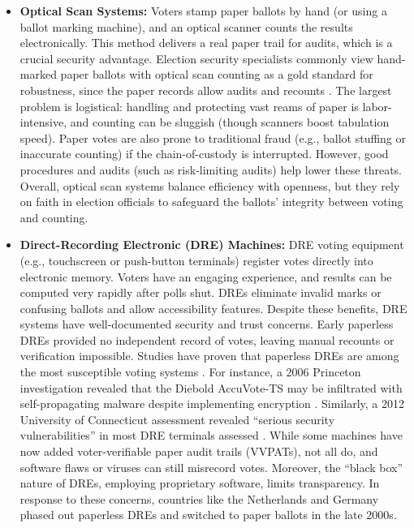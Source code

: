 \documentclass[a4paper,10pt]{report}
\begin{document}
  \begin{itemize} \item \textbf  {Optical Scan Systems:}   Voters stamp paper ballots by hand (or using a ballot marking machine), and an optical scanner counts the results electronically.   This method delivers a real paper trail for audits, which is a crucial security advantage.   Election security specialists commonly view hand-marked paper ballots with optical scan counting as a gold standard for robustness, since the paper records allow audits and recounts \cite{brookings}.   The largest problem is logistical: handling and protecting vast reams of paper is labor-intensive, and counting can be sluggish (though scanners boost tabulation speed).   Paper votes are also prone to traditional fraud (e.g., ballot stuffing or inaccurate counting) if the chain-of-custody is interrupted.   However, good procedures and audits (such as risk-limiting audits) help lower these threats.   Overall, optical scan systems balance efficiency with openness, but they rely on faith in election officials to safeguard the ballots’ integrity between voting and counting.

      \item \textbf  {Direct-Recording Electronic (DRE) Machines:}   DRE voting equipment (e.g., touchscreen or push-button terminals) register votes directly into electronic memory.   Voters have an engaging experience, and results can be computed very rapidly after polls shut.   DREs eliminate invalid marks or confusing ballots and allow accessibility features.   Despite these benefits, DRE systems have well-documented security and trust concerns.   Early paperless DREs provided no independent record of votes, leaving manual recounts or verification impossible.   Studies have proven that paperless DREs are among the most susceptible voting systems \cite{brookings}.   For instance, a 2006 Princeton investigation revealed that the Diebold AccuVote-TS may be infiltrated with self-propagating malware despite implementing encryption \cite{felten2006}.   Similarly, a 2012 University of Connecticut assessment revealed “serious security vulnerabilities” in most DRE terminals assessed \cite{uconn2012_combined}.   While some machines have now added voter-verifiable paper audit trails (VVPATs), not all do, and software flaws or viruses can still misrecord votes.   Moreover, the “black box” nature of DREs, employing proprietary software, limits transparency.   In response to these concerns, countries like the Netherlands and Germany phased out paperless DREs and switched to paper ballots in the late 2000s.


\end{itemize}
\end{document}
